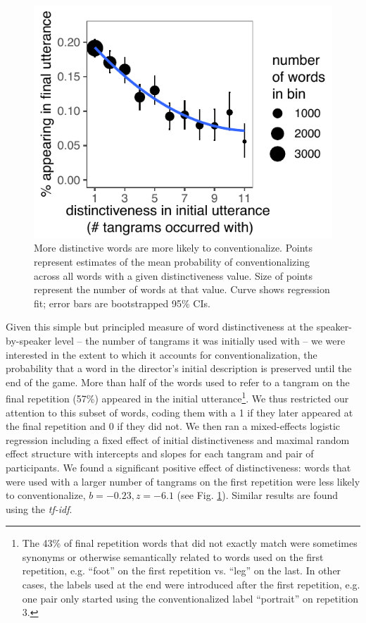 \documentclass[alpha-refs]{wiley-article}
\begin{document}
\begin{figure}[t!]
\centering
\includegraphics[scale=.85]{distinctiveness.pdf}
\caption{More distinctive words are more likely to conventionalize. Points represent estimates of the mean probability of conventionalizing across all words with a given distinctiveness value. Size of points represent the number of words at that value. Curve shows regression fit; error bars are bootstrapped 95\% CIs.}
\label{fig:distinct}
\end{figure}

Given this simple but principled measure of word distinctiveness at the speaker-by-speaker level -- the number of tangrams it was initially used with -- we were interested in the extent to which it accounts for conventionalization, the probability that a word in the director's initial description is preserved until the end of the game. 
More than half of the words used to refer to a tangram on the final repetition (57\%) appeared in the initial utterance\footnote{The 43\% of final repetition words that did not exactly match were sometimes synonyms or otherwise semantically related to words used on the first repetition, e.g. ``foot'' on the first repetition vs. ``leg'' on the last. In other cases, the labels used at the end were introduced after the first repetition, e.g. one pair only started using the conventionalized label ``portrait'' on repetition 3.}.
We thus restricted our attention to this subset of words, coding them with a 1 if they later appeared at the final repetition and 0 if they did not.
We then ran a mixed-effects logistic regression including a fixed effect of initial distinctiveness and maximal random effect structure with intercepts and slopes for each tangram and pair of participants.
We found a significant positive effect of distinctiveness: words that were used with a larger number of tangrams on the first repetition were less likely to conventionalize, $b = -0.23, z = -6.1$ (see Fig. \ref{fig:distinct}). 
Similar results are found using the \emph{tf-idf}.
\end{document}
